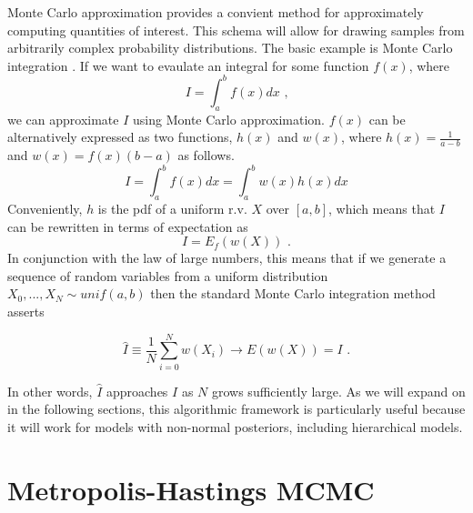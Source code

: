 \documentclass[
  12pt,
]{book}
\theoremstyle{definition}
\theoremstyle{definition}
\theoremstyle{definition}
\theoremstyle{remark}
\begin{document}
Monte Carlo approximation provides a convient method for approximately computing quantities of interest.
This schema will allow for drawing samples from arbitrarily complex probability distributions.
The basic example is Monte Carlo integration \citep[  24.2]{Wasserman2004}.
If we want to evaulate an integral for some function \(f(x)\), where
\[I=\int_{a}^{b}f(x)dx \textrm{ ,}\]
we can approximate \(I\) using Monte Carlo approximation. \(f(x)\) can be alternatively expressed as two functions, \(h(x)\) and \(w(x)\), where \(h(x)=\frac{1}{a-b}\) and \(w(x)=f(x)(b-a)\) as follows.
\[I=\int_{a}^{b}f(x)dx=\int_{a}^{b}w(x)h(x)dx\]
Conveniently, \(h\) is the pdf of a uniform r.v. \(X\) over \([a,b]\), which means that \(I\) can be rewritten in terms of expectation as
\[I=E_{f}(w(X)) \textrm{ .}\]
In conjunction with the law of large numbers, this means that if we generate a sequence of random variables from a uniform distribution \(X_{0},...,X_{N}\sim unif(a,b)\) then the standard Monte Carlo integration method asserts

\[\hat{I}\equiv\frac{1}{N}\sum_{i=0}^{N}w(X_{i})\rightarrow E(w(X))=I \textrm{ .}\]

In other words, \(\hat{I}\) approaches \(I\) as \(N\) grows sufficiently large.
As we will expand on in the following sections, this algorithmic framework is particularly useful because it will work for models with non-normal posteriors, including hierarchical models.

\hypertarget{metropolis-hastings-mcmc}{%
\section{Metropolis-Hastings MCMC}\label{metropolis-hastings-mcmc}}
\end{document}
